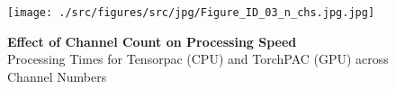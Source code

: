         \clearpage
        \begin{figure}[ht]
        	\centering
            \texttt{[image: ./src/figures/src/jpg/Figure\_ID\_03\_n\_chs.jpg.jpg]}

\caption{\textbf{
Effect of Channel Count on Processing Speed
}
\smallskip
\\
Processing Times for Tensorpac (CPU) and TorchPAC (GPU) across Channel Numbers
}
        	\label{fig:03_n_chs}
        \end{figure}
